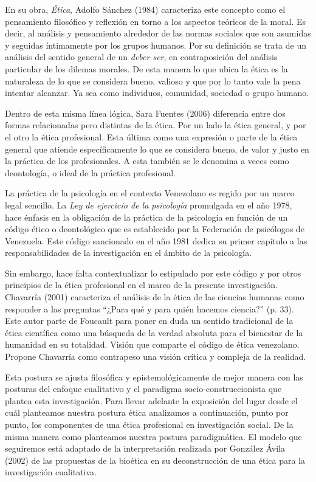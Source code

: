 En su obra, \emph{Ética}, Adolfo Sánchez (1984) caracteriza este
concepto como el pensamiento filosófico y reflexión en torno a los aspectos
teóricos de la moral.
Es decir, al análisis y pensamiento alrededor de las normas sociales que son
asumidas y seguidas íntimamente por los grupos humanos.
Por su definición se trata de un análisis del sentido general de un
\emph{deber ser}, en contraposición del análisis particular de los dilemas
morales.
De esta manera lo que ubica la ética es la naturaleza de lo que se considera
bueno, valioso y que por lo tanto vale la pena intentar alcanzar.
Ya sea como individuos, comunidad, sociedad o grupo humano.

Dentro de esta misma línea lógica, Sara Fuentes (2006) diferencia entre dos
formas relacionadas pero distintas de la ética.
Por un lado la ética general, y por el otro la ética profesional.
Esta última como una expresión o parte de la ética general que atiende
específicamente lo que se considera bueno, de valor y justo en la práctica de
los profesionales.
A esta también se le denomina a veces como deontología, o ideal de la
práctica profesional.

La práctica de la psicología en el contexto Venezolano es regido por un marco
legal sencillo.
La \emph{Ley de ejercicio de la psicología} promulgada en el año 1978, hace
énfasis en la obligación de la práctica de la psicología en función de un
código ético o deontológico que es establecido por la Federación de
psicólogos de Venezuela.
Este código sancionado en el año 1981 dedica su primer capítulo a las
responsabilidades de la investigación en el ámbito de la psicología.

Sin embargo, hace falta contextualizar lo estipulado por este código y por
otros principios de la ética profesional en el marco de la presente
investigación.
Chavarría (2001) caracteriza el análisis de la ética de las ciencias humanas
como responder a las preguntas “¿Para qué y para quién hacemos ciencia?” (p.
33).
Este autor parte de Foucault para poner en duda un sentido tradicional de la
ética científica como una búsqueda de la verdad absoluta para el bienestar de
la humanidad en su totalidad.
Visión que comparte el código de ética venezolano.
Propone Chavarría como contrapeso una visión crítica y compleja de la
realidad.

Esta postura se ajusta filosófica y epistemológicamente de mejor manera con las
posturas del enfoque cualitativo y el paradigma socio-construccionista que
plantea esta investigación.
Para llevar adelante la exposición del lugar desde el cuál planteamos nuestra
postura ética analizamos a continuación, punto por punto, los componentes de
una ética profesional en investigación social.
De la misma manera como planteamos nuestra postura paradigmática.
El modelo que seguiremos está adaptado de la interpretación realizada por
González Ávila (2002) de las propuestas de la bioética en su deconstrucción de
una ética para la investigación cualitativa.

